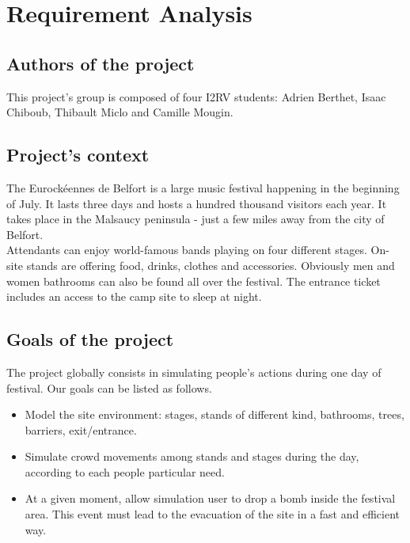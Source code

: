\chapter{Requirement Analysis}

\section{Authors of the project}

This project's group is composed of four I2RV students: Adrien Berthet, Isaac 
Chiboub, Thibault Miclo and Camille Mougin.

\section{Project's context}

The Eurockéennes de Belfort is a large music festival happening in the beginning
of July. It lasts three days and hosts a hundred thousand visitors each year. It
takes place in the Malsaucy peninsula - just a few miles away from the city of
Belfort. \\

Attendants can enjoy world-famous bands playing on four different stages.
On-site stands are offering food, drinks, clothes and accessories. Obviously men
and women bathrooms can also be found all over the festival. The entrance ticket
includes an access to the camp site to sleep at night.

\section{Goals of the project}

The project globally consists in simulating people's actions during one day of
festival. Our goals can be listed as follows.\\

\begin{itemize}
	\item Model the site environment: stages, stands of different kind, 
	bathrooms, trees, barriers, exit/entrance.
	\item Simulate crowd movements among stands and stages during the day, 
	according to each people particular need.
	\item At a given moment, allow simulation user to drop a bomb inside the 
	festival area. This event must lead to the evacuation of the site in a fast 
	and efficient way.
\end{itemize}

